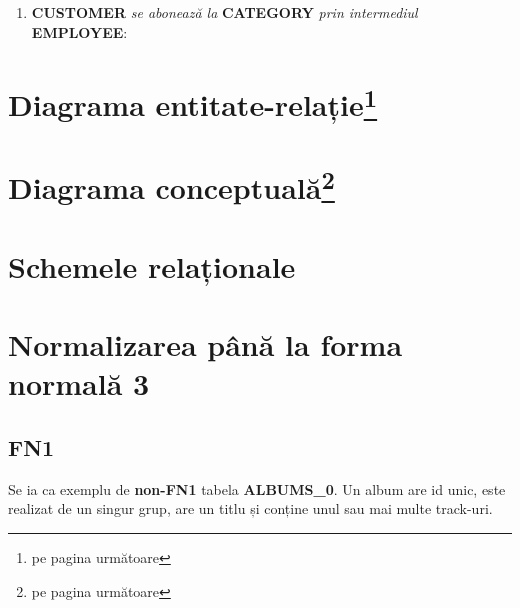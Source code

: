\documentclass[a4paper, oneside, 12pt]{article}
\newcommand{\datet}{variabilă de tip \emph{dată calendaristică}\xspace}
\newcommand{\rowstyle}[1]{\gdef\currentrowstyle{#1}%
  #1\ignorespaces
}
\begin{document}
\begin{enumerate}[noitemsep, label=\roman*.]
\item \textbf{CUSTOMER} \emph{se abonează la} \textbf{CATEGORY} \emph{prin intermediul} \textbf{EMPLOYEE}:

\end{enumerate}

\section{Diagrama entitate-relație\footnote{pe pagina următoare}}



\section{Diagrama conceptuală\footnote{pe pagina următoare}}
\label{ldiagconcept}



\section{Schemele relaționale}

\begin{center}



\end{center}

\section{Normalizarea până la forma normală 3}

\subsection{FN1}

Se ia ca exemplu de \textbf{non-FN1} tabela \textbf{ALBUMS\_0}. Un album are id
unic, este realizat de un singur grup, are un titlu și conține unul sau mai multe track-uri.


\begin{table}[h]
\centering
\caption*{Tabela \textbf{ALBUMS\_0}:}
\end{table}
\end{document}
